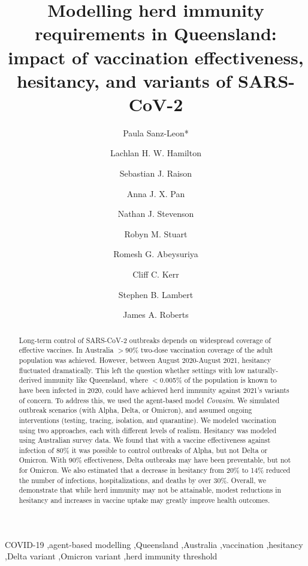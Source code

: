 \documentclass[article, a4, authoryear]{elsarticle}
\begin{document}
\begin{frontmatter}

\title{Modelling herd immunity requirements in Queensland: impact of vaccination effectiveness, hesitancy, and variants of SARS-CoV-2} 
\author[1]{Paula Sanz-Leon*}
\author[1]{Lachlan H. W. Hamilton}
\author[1]{Sebastian J. Raison}
\author[1]{Anna J. X. Pan}
\author[1]{Nathan J. Stevenson}
\author[2]{Robyn M. Stuart}
\author[3]{Romesh G. Abeysuriya}
\author[4]{Cliff C. Kerr}
\author[5]{Stephen B. Lambert}
\author[1]{James A. Roberts}

\address[1]{Brain Modelling Group, QIMR Berghofer Medical Research Institute, Brisbane, QLD, Australia}
\address[2]{Department of Mathematical Sciences, University of Copenhagen, Copenhagen, Denmark}
\address[3]{Burnet Institute, Melbourne, VIC, Australia}
\address[4]{Institute for Disease Modeling, Bill \& Melinda Gates Foundation, Seattle, WA, USA}
\address[5]{National Centre for Immunisation Research and Surveillance for Vaccine Preventable Diseases, Westmead, NSW, Australia}


\begin{abstract}
Long-term control of SARS-CoV-2 outbreaks depends on widespread coverage of effective vaccines. In Australia $>$90\% two-dose vaccination coverage of the adult population was achieved. However, between August 2020-August 2021, hesitancy fluctuated dramatically. This left the question whether settings with low naturally-derived immunity like Queensland, where $<$0.005\% of the population is known to have been infected in 2020, could have achieved herd immunity against 2021's variants of concern. To address this, we used the agent-based model \textit{Covasim}. We simulated outbreak scenarios (with Alpha, Delta, or Omicron), and assumed ongoing interventions (testing, tracing, isolation, and quarantine). We modeled vaccination using two approaches, each with different levels of realism. Hesitancy was modeled using Australian survey data. We found that with a vaccine effectiveness against infection of 80\% it was possible to control outbreaks of Alpha, but not Delta or Omicron. With 90\% effectiveness, Delta outbreaks may have been preventable, but not for Omicron. We also estimated that a decrease in hesitancy from 20\% to 14\% reduced the number of infections, hospitalizations, and deaths by over 30\%. Overall, we demonstrate that while herd immunity may not be attainable, modest reductions in hesitancy and increases in vaccine uptake may greatly improve health outcomes.
\end{abstract}
\begin{keyword}
COVID-19 \sep agent-based modelling \sep Queensland \sep Australia \sep vaccination \sep hesitancy \sep Delta variant \sep Omicron variant \sep herd immunity threshold
\end{keyword}

\end{frontmatter}
\linenumbers
\end{document}
